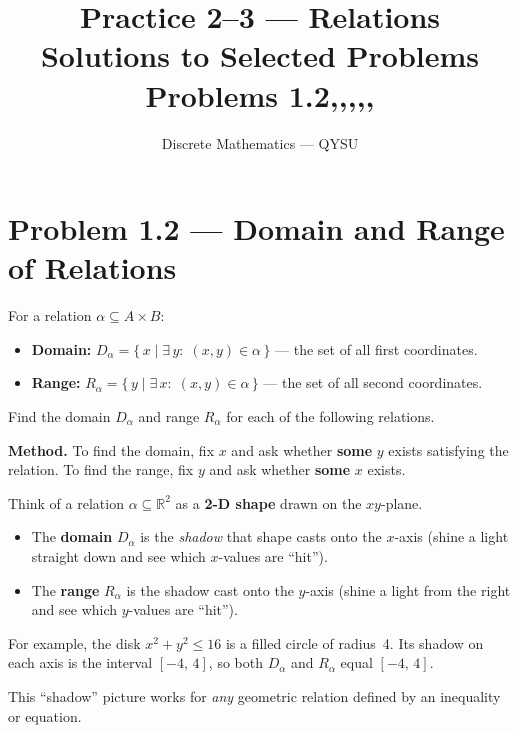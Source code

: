 \documentclass[12pt, a4paper]{article}
\title{\textbf{Practice 2--3 --- Relations}\\[4pt]
       \large Solutions to Selected Problems\\[2pt]
       \normalsize Problems 1.2,\; 2.1,\; 2.2,\; 3.3,\; 4.1,\; 7.2}
\author{Discrete Mathematics --- QYSU}
\date{}
\newcommand{\R}{\mathbb{R}}
\begin{document}
\maketitle
\tableofcontents
\newpage

\section{Problem 1.2 --- Domain and Range of Relations}

\begin{theorybox}
For a relation $\alpha \subseteq A \times B$:
\begin{itemize}[nosep]
  \item \textbf{Domain:} $D_\alpha = \{\,x \mid \exists\, y:\; (x,y) \in \alpha\,\}$ --- the set of all first coordinates.
  \item \textbf{Range:} $R_\alpha = \{\,y \mid \exists\, x:\; (x,y) \in \alpha\,\}$ --- the set of all second coordinates.
\end{itemize}
\end{theorybox}

\begin{problembox}
Find the domain $D_\alpha$ and range $R_\alpha$ for each of the following relations.
\end{problembox}

\textbf{Method.}\; To find the domain, fix $x$ and ask whether \textbf{some} $y$ exists satisfying the relation. To find the range, fix $y$ and ask whether \textbf{some} $x$ exists.

\medskip

\begin{tcolorbox}[colback=blue!3, colframe=setA!60, arc=2mm, left=5pt, right=5pt, top=4pt, bottom=4pt,
  fonttitle=\bfseries, title={\small Intuition: Shadow Projection Analogy}]
Think of a relation $\alpha \subseteq \R^2$ as a \textbf{2-D shape} drawn on the $xy$-plane.
\begin{itemize}[nosep]
  \item The \textbf{domain} $D_\alpha$ is the \emph{shadow} that shape casts onto the $x$-axis
        (shine a light straight down and see which $x$-values are ``hit'').
  \item The \textbf{range} $R_\alpha$ is the shadow cast onto the $y$-axis
        (shine a light from the right and see which $y$-values are ``hit'').
\end{itemize}
\smallskip
For example, the disk $x^2 + y^2 \le 16$ is a filled circle of radius~4.
Its shadow on each axis is the interval $[-4,\,4]$, so both $D_\alpha$ and $R_\alpha$ equal $[-4,\,4]$.

This ``shadow'' picture works for \emph{any} geometric relation defined by an inequality or equation.
\end{tcolorbox}
\end{document}
